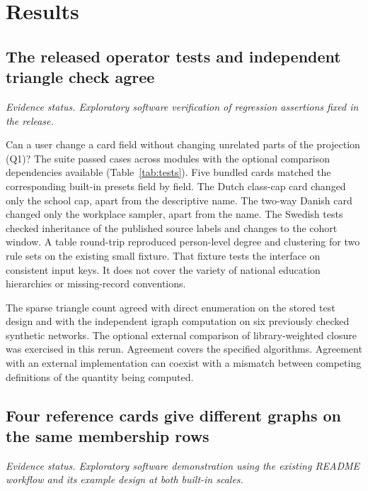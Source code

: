\section{Results}\label{sec:results}

\subsection{The released operator tests and independent triangle check agree}
\label{res:tests}
\textit{Evidence status. Exploratory software verification of regression assertions fixed in the release.}

Can a user change a card field without changing unrelated parts of the projection (Q1)? The suite passed \TestCount{} cases across \TestModules{} modules with the optional comparison dependencies available (Table~\ref{tab:tests}). Five bundled cards matched the corresponding built-in presets field by field. The Dutch class-cap card changed only the school cap, apart from the descriptive name. The two-way Danish card changed only the workplace sampler, apart from the name. The Swedish tests checked inheritance of the published source labels and changes to the cohort window. A table round-trip reproduced person-level degree and clustering for two rule sets on the existing small fixture. That fixture tests the interface on consistent input keys. It does not cover the variety of national education hierarchies or missing-record conventions.


The sparse triangle count agreed with direct enumeration on the stored test design and with the independent igraph computation on six previously checked synthetic networks. The optional external comparison of library-weighted closure was exercised in this rerun. Agreement covers the specified algorithms. Agreement with an external implementation can coexist with a mismatch between competing definitions of the quantity being computed.

\subsection{Four reference cards give different graphs on the same membership rows}
\label{res:example}
\textit{Evidence status. Exploratory software demonstration using the existing README workflow and its example design at both built-in scales.}

